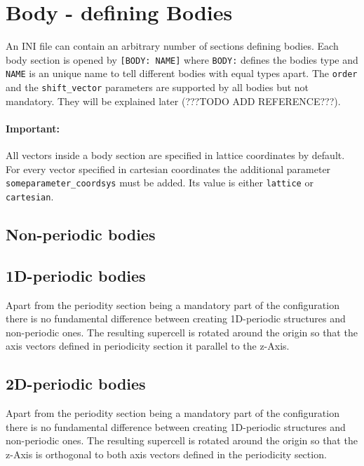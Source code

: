 \section{Body - defining Bodies}

An INI file can contain an arbitrary number of sections defining bodies. Each body section is opened by \lstinline{[BODY: NAME]} where \lstinline{BODY:} defines the bodies type and \lstinline{NAME} is an unique name to tell different bodies with equal types apart. The \lstinline{order} and the \lstinline{shift_vector} parameters are supported by all bodies but not mandatory. They will be explained later (???TODO ADD REFERENCE???).

\paragraph{Important:} All vectors inside a body section are specified in lattice coordinates by default. For every vector specified in cartesian coordinates the additional parameter \lstinline{someparameter_coordsys} must be added. Its value is either \lstinline{lattice} or \lstinline{cartesian}.

\subsection{Non-periodic bodies}



\subsection{1D-periodic bodies}
Apart from the periodity section being a mandatory part of the configuration there is no fundamental difference between creating 1D-periodic structures and non-periodic ones. The resulting supercell is rotated around the origin so that the axis vectors defined in periodicity section it parallel to the z-Axis.




\subsection{2D-periodic bodies}

Apart from the periodity section being a mandatory part of the configuration there is no fundamental difference between creating 1D-periodic structures and non-periodic ones. The resulting supercell is rotated around the origin so that the z-Axis is orthogonal to both axis vectors defined in the periodicity section.